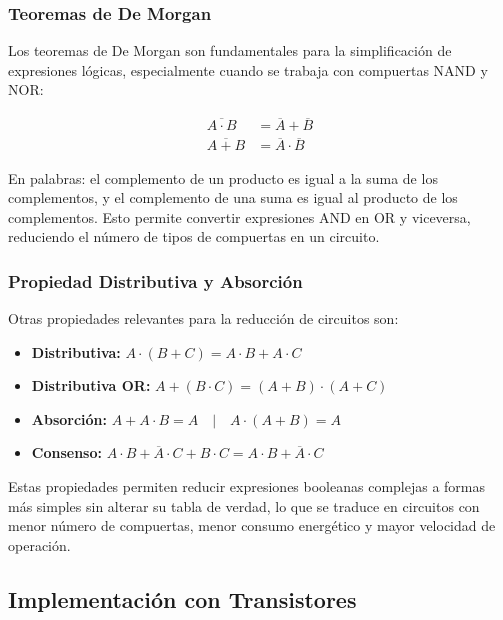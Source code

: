 \documentclass[12pt,letterpaper]{article}
\newcommand{\boolnot}[1]{\ensuremath{\overline{#1}}}
\begin{document}
    \subsubsection{Teoremas de De Morgan}
    
    Los teoremas de De Morgan son fundamentales para la simplificación de expresiones lógicas,
    especialmente cuando se trabaja con compuertas NAND y NOR:
    
    \begin{align}
    \boolnot{A \cdot B} &= \boolnot{A} + \boolnot{B} \\[4pt]
    \boolnot{A + B}     &= \boolnot{A} \cdot \boolnot{B}
    \end{align}
    
    En palabras: el complemento de un producto es igual a la suma de los complementos, y
    el complemento de una suma es igual al producto de los complementos. Esto permite
    convertir expresiones AND en OR y viceversa, reduciendo el número de tipos de compuertas
    en un circuito.
    
    \subsubsection{Propiedad Distributiva y Absorción}
    
    Otras propiedades relevantes para la reducción de circuitos son:
    
    \begin{itemize}[leftmargin=1.5cm]
    \item \textbf{Distributiva:}
            $A \cdot (B + C) = A \cdot B + A \cdot C$
    \item \textbf{Distributiva OR:}
            $A + (B \cdot C) = (A+B)\cdot(A+C)$
    \item \textbf{Absorción:}
            $A + A \cdot B = A \quad|\quad A \cdot (A + B) = A$
    \item \textbf{Consenso:}
            $A \cdot B + \boolnot{A} \cdot C + B \cdot C = A \cdot B + \boolnot{A} \cdot C$
    \end{itemize}
    
    Estas propiedades permiten reducir expresiones booleanas complejas a formas más simples
    sin alterar su tabla de verdad, lo que se traduce en circuitos con menor número de
    compuertas, menor consumo energético y mayor velocidad de operación.
    
    \subsection{Implementación con Transistores}
    
\end{document}
